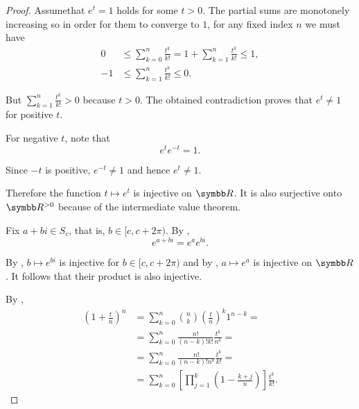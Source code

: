 \begin{proof}
  Assume\LEM that \( e^t = 1 \) holds for some \( t > 0 \). The partial sums are monotonely increasing so in order for them to converge to \( 1 \), for any fixed index \( n \) we must have
  \begin{align*}
    0  & \leq \sum_{k=0}^n \frac {t^k} {k!} = 1 + \sum_{k=1}^n \frac {t^k} {k!} \leq 1, \\
    -1 & \leq \sum_{k=1}^n \frac {t^k} {k!} \leq 0.
  \end{align*}

  But \( \sum_{k=1}^n \frac {t^k} {k!} > 0 \) because \( t > 0 \). The obtained contradiction proves that \( e^t \neq 1 \) for positive \( t \).

  For negative \( t \), note that
  \begin{equation*}
    e^t e^{-t} = 1.
  \end{equation*}

  Since \( -t \) is positive, \( e^{-t} \neq 1 \) and hence \( e^t \neq 1 \).

  Therefore the function \( t \mapsto e^t \) is injective on \( \BR \). It is also surjective onto \( \BR^{>0} \) because of the intermediate value theorem.

   Fix \( a + bi \in S_c \), that is, \( b \in [c, c + 2\pi) \). By ,
  \begin{equation*}
    e^{a + bi} = e^a e^{bi}.
  \end{equation*}

  By , \( b \mapsto e^{bi} \) is injective for \( b \in [c, c + 2\pi) \) and by , \( a \mapsto e^a \) is injective on \( \BR \). It follows that their product is also injective.

  By ,
  \begin{align*}
    \left(1 + \frac t n \right)^n
     & =
    \sum_{k=0}^n \binom{n}{k} \left(\frac t n\right)^k 1^{n-k}
    =    \\ &=
    \sum_{k=0}^n \frac {n!} {(n-k)! k!} \frac {t^k} {n^k}
    =    \\ &=
    \sum_{k=0}^n \frac {n!} {(n-k)! n^k} \frac {t^k} {k!}
    =    \\ &=
    \sum_{k=0}^n \left[ \prod_{j=1}^k \left(1 - \frac {k+j} n \right) \right] \frac {t^k} {k!}.
  \end{align*}


\end{proof}

